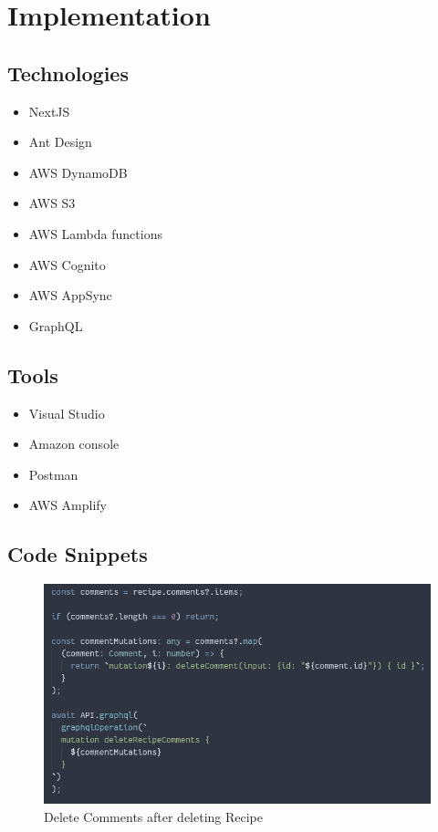 %
%
\chapter{Implementation}%
%
\label{chapter:implementation}

\section{Technologies} 

\begin{itemize}
  \item NextJS
  \item Ant Design
  \item AWS DynamoDB
  \item AWS S3
  \item AWS Lambda functions
  \item AWS Cognito
  \item AWS AppSync
  \item GraphQL
\end{itemize}

\section{Tools} 

\begin{itemize}
  \item Visual Studio
  \item Amazon console
  \item Postman
  \item AWS Amplify
\end{itemize}

\clearpage

\section{Code Snippets} 

\begin{figure}[!hb]
\centering
\caption[Delete Comments after deleting Recipe]{Delete Comments after deleting Recipe}%
\label{fig:delete_comments}
\includegraphics[width=\linewidth,height=\textheight,keepaspectratio]{img/delete_comments}
\end{figure} 


